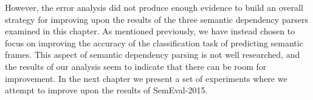 However, the error analysis did not produce enough evidence to build an overall strategy for improving upon the results of the three semantic dependency parsers examined in this chapter. As mentioned previously, we have instead chosen to focus on improving the accuracy of the classification task of predicting semantic frames. This aspect of semantic dependency parsing is not well researched, and the results of our analysis seem to indicate that there can be room for improvement. In the next chapter we present a set of experiments where we attempt to improve upon the results of SemEval-2015.